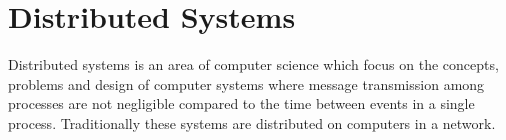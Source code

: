 	
	
	
	
	
	
	\section{Distributed Systems}
		Distributed systems is an area of computer science which focus on the concepts, problems and design of computer systems where message transmission among processes are not negligible compared to the time between events in a single process. Traditionally these systems are distributed on computers in a network.
		
